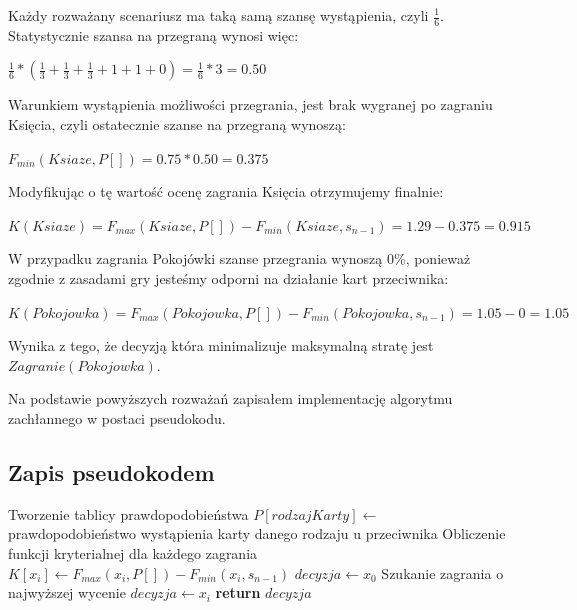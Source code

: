 Każdy rozważany scenariusz ma taką samą szansę wystąpienia, czyli $\frac{1}{6}$. Statystycznie szansa na przegraną wynosi więc:
\begin{center}
 $\frac{1}{6} * (\frac{1}{3} + \frac{1}{3} + \frac{1}{3} + 1 + 1 + 0) = \frac{1}{6} * 3 = 0.50 $
\end{center}
Warunkiem wystąpienia możliwości przegrania, jest brak wygranej po zagraniu Księcia, czyli ostatecznie szanse na przegraną wynoszą:
\begin{center}
	$F_{min}(Ksiaze, P[]) = 0.75 * 0.50 = 0.375$
\end{center}
Modyfikując o tę wartość ocenę zagrania Księcia otrzymujemy finalnie:
\begin{center}
	$K(Ksiaze) =  F_{max}(Ksiaze, P[]) - F_{min}(Ksiaze, s_{n-1}) = 1.29 - 0.375 = 0.915$
\end{center} 
W przypadku zagrania Pokojówki szanse przegrania wynoszą 0\%, ponieważ zgodnie z zasadami gry jesteśmy odporni na działanie kart przeciwnika:
\begin{center}
	$K(Pokojowka) =  F_{max}(Pokojowka, P[]) - F_{min}(Pokojowka, s_{n-1}) = 1.05 - 0 = 1.05$
\end{center} 
Wynika z tego, że decyzją która minimalizuje maksymalną stratę jest $Zagranie(Pokojowka)$.

Na podstawie powyższych rozważań zapisałem implementację algorytmu zachłannego w postaci pseudokodu.
\subsection{Zapis pseudokodem}
\begin{algorithmic}[1]
		 \Comment Tworzenie tablicy prawdopodobieństwa
			\State $P[rodzajKarty] \gets$  prawdopodobieństwo wystąpienia karty danego rodzaju u przeciwnika	
		\EndFor
		 \Comment Obliczenie funkcji kryterialnej dla każdego zagrania
			\State $K[x_i] \gets F_{max}(x_i, P[]) - F_{min}(x_i, s_{n-1})$
		\EndFor		
		\State $ decyzja \gets x_0$ \Comment Szukanie zagrania o najwyższej wycenie
				\State $decyzja \gets x_i$
			\EndIf
		\EndFor		
		\State \textbf{return} $decyzja$
	\EndFunction
\end{algorithmic}

